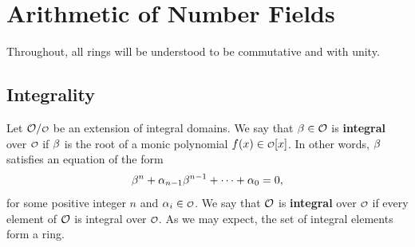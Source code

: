 \chapter{Arithmetic of Number Fields}
  Throughout, all rings will be understood to be commutative and with unity.
  \section{Integrality}
    Let \(\mc{O}/\smc{O}\) be an extension of integral domains. We say that \(\beta \in \mathcal{O}\) is \textbf{integral} over \(\smc{O}\) if \(\beta\) is the root of a monic polynomial \(f(x) \in \smc{O}[x]\). In other words, \(\beta\) satisfies an equation of the form
    \[
      \beta^{n}+\alpha_{n-1}\beta^{n-1}+\cdots+\alpha_{0} = 0,
    \]
    for some positive integer \(n\) and \(\a_{i} \in \smc{O}\). We say that \(\mathcal{O}\) is \textbf{integral} over \(\smc{O}\) if every element of \(\mathcal{O}\) is integral over \(\smc{O}\). As we may expect, the set of integral elements form a ring.

